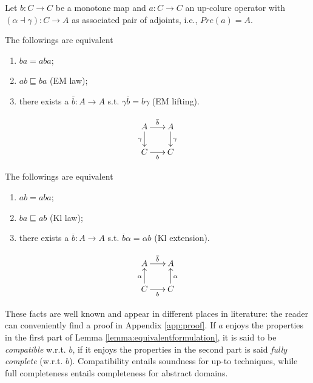 \documentclass{llncs}
\begin{document}
\begin{lemma}\label{lemma:equivalentformulation}
Let $b\colon C\to C$ be a monotone map and $a\colon C\to C$ an up-colure operator with $(\alpha \dashv \gamma)\colon C \to A$ as associated pair of adjoints, i.e., $Pre(a)=A$. 

\noindent The followings are equivalent

\begin{minipage}{0.7\textwidth}
\begin{enumerate}
\item $ba = aba$;
\item $ab \sqsubseteq ba$ (EM law);
\item there exists a  $\overline{b}\colon A \to A$ s.t.  $\gamma \overline{b} =  b \gamma$ (EM lifting).
\end{enumerate}\end{minipage}
\begin{minipage}{0.3\textwidth}
$$\xymatrix@R=0.2cm@C=0.2cm{
A \ar[rr]^{\overline{b}} \ar[dd]_\gamma & & A  \ar[dd]^\gamma \\ 
&  \\
C \ar[rr]_b & &  C 
}$$
\end{minipage}


\noindent The followings are equivalent

\begin{minipage}{0.7\textwidth}
\begin{enumerate}
\item $ab = aba$;
\item $ba \sqsubseteq ab$ (Kl law);
\item there exists a $\overline{b}\colon A \to A$ s.t. $\overline{b} \alpha = \alpha b$ (Kl extension).
\end{enumerate}\end{minipage}
\begin{minipage}{0.3\textwidth}
$$\xymatrix@R=0.2cm@C=0.2cm{A \ar[rr]^{\overline{b}} & & A\\ 
&  \\
C \ar[rr]_b \ar[uu]^\alpha & &  C \ar[uu]_\alpha
}$$
\end{minipage}
\end{lemma}
These facts are well known and appear in different places in literature: the reader can conveniently find a proof in Appendix \ref{app:proof}. If $a$ enjoys the properties in the first part of Lemma \ref{lemma:equivalentformulation}, it is said to be \emph{compatible} w.r.t. $b$, if it enjoys the properties in the second part is said \emph{fully complete} (w.r.t. $b$). Compatibility entails soundness for up-to techniques, while full completeness entails completeness for abstract domains.
\end{document}
